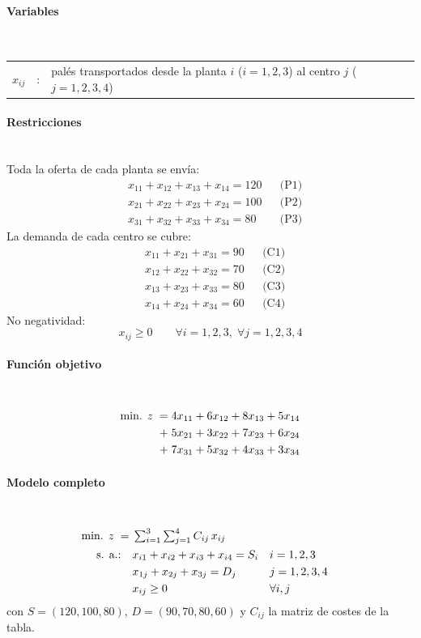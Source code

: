 \paragraph{Variables}\mbox{}\\
\begin{tabular}{l c l}
    $x_{ij}$ & : & palés transportados desde la planta $i$ ($i=1,2,3$) al centro $j$ ($j=1,2,3,4$)\\
\end{tabular}

\paragraph{Restricciones}\mbox{}\\
Toda la oferta de cada planta se envía:
\begin{align}
    & x_{11} + x_{12} + x_{13} + x_{14} = 120 && \text{(P1)}\\
    & x_{21} + x_{22} + x_{23} + x_{24} = 100 && \text{(P2)}\\
    & x_{31} + x_{32} + x_{33} + x_{34} = 80 && \text{(P3)}
\end{align}
La demanda de cada centro se cubre:
\begin{align}
    & x_{11} + x_{21} + x_{31} = 90 && \text{(C1)}\\
    & x_{12} + x_{22} + x_{32} = 70 && \text{(C2)}\\
    & x_{13} + x_{23} + x_{33} = 80 && \text{(C3)}\\
    & x_{14} + x_{24} + x_{34} = 60 && \text{(C4)}
\end{align}
No negatividad:
\begin{equation}
    x_{ij} \geq 0 \qquad \forall i=1,2,3,\; \forall j=1,2,3,4
\end{equation}

\paragraph{Función objetivo}\mbox{}\\
\begin{align}
\mbox{min. } z \;=\;
& 4x_{11} + 6x_{12} + 8x_{13} + 5x_{14} \notag\\
+\;& 5x_{21} + 3x_{22} + 7x_{23} + 6x_{24} \notag\\
+\;& 7x_{31} + 5x_{32} + 4x_{33} + 3x_{34}
\end{align}

\paragraph{Modelo completo}\mbox{}\\
\begin{align}
\mbox{min. } z \;=\;& \textstyle\sum_{i=1}^{3}\sum_{j=1}^{4} C_{ij}\, x_{ij} \notag\\
\mbox{s. a.:}\quad
& x_{i1} + x_{i2} + x_{i3} + x_{i4} = S_i && i=1,2,3 \notag\\
& x_{1j} + x_{2j} + x_{3j} = D_j && j=1,2,3,4 \notag\\
& x_{ij} \geq 0 && \forall i,j \notag
\end{align}
con $S=(120,100,80)$, $D=(90,70,80,60)$ y $C_{ij}$ la matriz de costes de la tabla.

